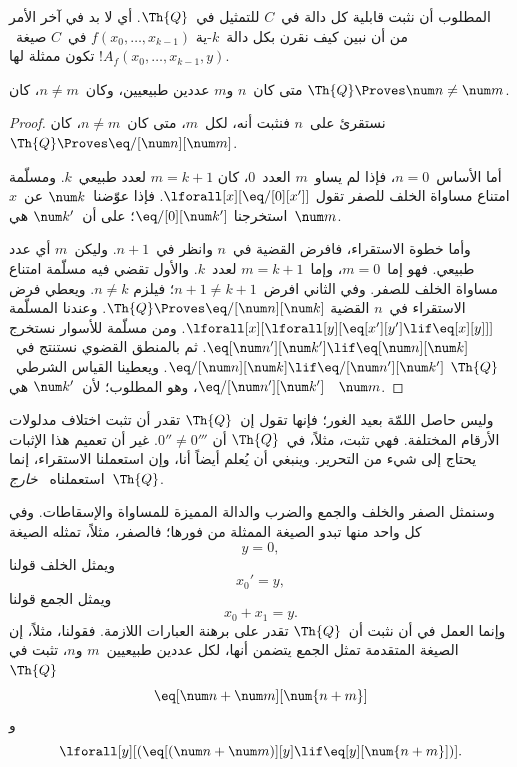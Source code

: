 \documentclass[../../../include/open-logic-section]{subfiles}
\begin{document}

المطلوب أن نثبت قابلية كل دالة في~$C$ للتمثيل في~$\Th{Q}$. أي لا بد في
آخر الأمر من أن نبين كيف نقرن بكل دالة~$k$-ية
$f(x_0,\dots,x_{k-1})$ في~$C$ صيغة~$!A_f(x_0,\dots,x_{k-1},y)$ تكون
ممثلة لها.

\begin{lem}
متى كان~$n$ و$m$ عددين طبيعيين، وكان~$n \neq m$، كان
$\Th{Q} \Proves \num n \neq \num m$.
\end{lem}

\begin{proof}
نستقرئ على~$n$ فنثبت أنه، لكل~$m$، متى كان~$n \neq m$، كان
$\Th{Q} \Proves \eq/[\num n][\num m]$.

أما الأساس~$n = 0$، فإذا لم يساو~$m$ العدد~$0$، كان
$m = k + 1$ لعدد طبيعي~$k$. ومسلّمة امتناع مساواة الخلف للصفر تقول
$\lforall[x][\eq/[0][x']]$. فإذا عوّضنا~$\num k$ عن~$x$ استخرجنا
$\eq/[0][\num k']$؛ على أن~$\num k'$ هي~$\num m$.

وأما خطوة الاستقراء، فافرض القضية في~$n$ وانظر في~$n+1$. وليكن~$m$ أي
عدد طبيعي. فهو إما~$m = 0$، وإما~$m = k+1$ لعدد~$k$. والأول تقضي فيه
مسلّمة امتناع مساواة الخلف للصفر. وفي الثاني افرض~$n+1 \neq k+1$؛ فيلزم
$n \neq k$. ويعطي فرض الاستقراء في~$n$ القضية
$\Th{Q} \Proves \eq/[\num n][\num k]$. وعندنا المسلّمة
$\lforall[x][\lforall[y][\eq[x'][y'] \lif \eq[x][y]]]$. ومن مسلّمة
للأسوار نستخرج
$\eq[\num n'][\num k'] \lif \eq[\num n][\num k]$. ثم بالمنطق القضوي
نستنتج في~$\Th{Q}$
$\eq/[\num n][\num k] \lif \eq/[\num n'][\num k']$. ويعطينا القياس
الشرطي~$\eq/[\num n'][\num k']$، وهو المطلوب؛ لأن~$\num k'$ هي
~$\num m$.
\end{proof}

وليس حاصل اللمّة بعيد الغور؛ فإنها تقول إن~$\Th{Q}$ تقدر أن تثبت اختلاف
مدلولات الأرقام المختلفة. فهي تثبت، مثلاً، في~$\Th{Q}$ أن
$0'' \neq 0'''$. غير أن تعميم هذا الإثبات يحتاج إلى شيء من التحرير.
وينبغي أن يُعلم أيضاً أنا، وإن استعملنا الاستقراء، إنما استعملناه
~\emph{خارج}~$\Th{Q}$.

وسنمثل الصفر والخلف والجمع والضرب والدالة المميزة للمساواة والإسقاطات.
وفي كل واحد منها تبدو الصيغة الممثلة من فورها؛ فالصفر، مثلاً، تمثله
الصيغة
\[
y = 0,
\]
ويمثل الخلف قولنا
\[
x_0' = y,
\]
ويمثل الجمع قولنا
\[
x_0 + x_1 = y.
\]
وإنما العمل في أن نثبت أن~$\Th{Q}$ تقدر على برهنة العبارات اللازمة.
فقولنا، مثلاً، إن الصيغة المتقدمة تمثل الجمع يتضمن أنها، لكل عددين
طبيعيين~$m$ و$n$، تثبت في~$\Th{Q}$
\[
\eq[\num n + \num m][\num {n+m}]
\]
و
\[
\lforall[y][(\eq[(\num n + \num m)][y] \lif \eq[y][\num {n+m}])].
\]
\end{document}
